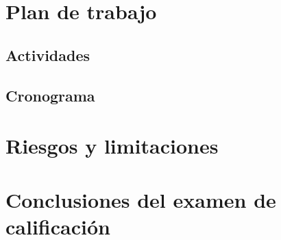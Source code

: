 \documentclass[12pt,a4paper]{report}
\begin{document}
\chapter{Plan de trabajo}

%


\section{Actividades}

%


\section{Cronograma}

%
%



\chapter{Riesgos y limitaciones}

%
%
%



\chapter{Conclusiones del examen de calificación}

%
%
%
%
%
%
%
%
%





\end{document}

